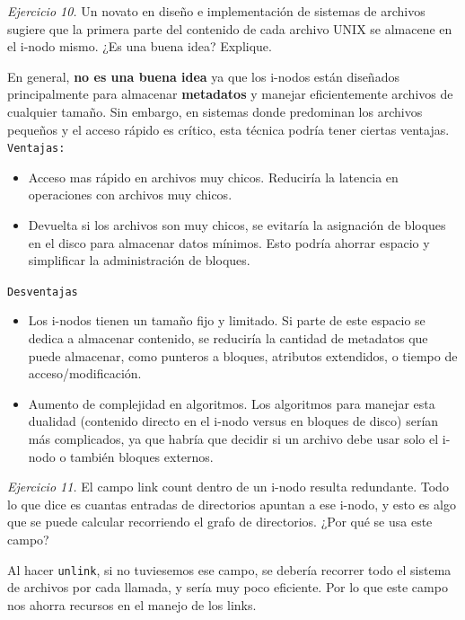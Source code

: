 \documentclass[12pt]{article}
\begin{document}
\noindent \textit{Ejercicio 10.} Un novato en diseño e implementación de sistemas de archivos sugiere que la primera parte del contenido de cada archivo UNIX se almacene en el i-nodo mismo. ¿Es una buena idea? Explique.

\begin{rta}
    En general, \textbf{no es una buena idea} ya que los i-nodos están diseñados principalmente para almacenar \textbf{metadatos} y manejar eficientemente archivos de cualquier tamaño. Sin embargo, en sistemas donde predominan los archivos pequeños y el acceso rápido es crítico, esta técnica podría tener ciertas ventajas.
    \newline \texttt{Ventajas:}
    \begin{itemize}
        \item Acceso mas rápido en archivos muy chicos. Reduciría la latencia en operaciones con archivos muy chicos.
        \item Devuelta si los archivos son muy chicos,  se evitaría la asignación de bloques en el disco para almacenar datos mínimos. Esto podría ahorrar espacio y simplificar la administración de bloques.
    \end{itemize}
    \texttt{Desventajas}
    \begin{itemize}
        \item Los i-nodos tienen un tamaño fijo y limitado. Si parte de este espacio se dedica a almacenar contenido, se reduciría la cantidad de metadatos que puede almacenar, como punteros a bloques, atributos extendidos, o tiempo de acceso/modificación.
        \item Aumento de complejidad en algoritmos. Los algoritmos para manejar esta dualidad (contenido directo en el i-nodo versus en bloques de disco) serían más complicados, ya que habría que decidir si un archivo debe usar solo el i-nodo o también bloques externos.
    \end{itemize}
\end{rta}

\newpage
\noindent \textit{Ejercicio 11.} El campo link count dentro de un i-nodo resulta redundante. Todo lo que dice es cuantas entradas de directorios apuntan a ese i-nodo, y esto es algo que se puede calcular recorriendo el grafo de directorios. ¿Por qué se usa este campo?

\begin{rta}
    Al hacer \texttt{unlink}, si no tuviesemos ese campo, se debería recorrer todo el sistema de archivos por cada llamada, y sería muy poco eficiente. Por lo que este campo nos ahorra recursos en el manejo de los links.
\end{rta}
\end{document}
